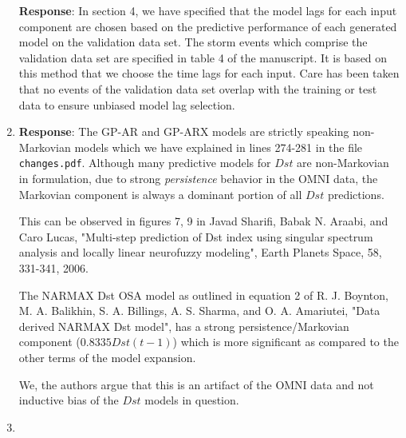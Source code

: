 \documentclass{article}
\begin{document}
\begin{enumerate}
{\textbf{Response}: In section 4, we have specified that the model lags for each input component are chosen based on the predictive performance of each generated model on the validation data set. The storm events which comprise the validation data set are specified in table 4 of the manuscript. It is based on this method that we choose the time lags for each input. Care has been taken that no events of the validation data set overlap with the training or test data to ensure unbiased model lag selection.


}

\item{


\textbf{Response}: The GP-AR and GP-ARX models are strictly speaking non-Markovian models which we have explained in lines 274-281 in the file \texttt{changes.pdf}. Although many predictive models for $Dst$ are non-Markovian in formulation, due to strong \emph{persistence} behavior in the OMNI data, the Markovian component is always a dominant portion of all $Dst$ predictions. 

This can be observed in figures 7, 9 in Javad Sharifi, Babak N. Araabi, and Caro Lucas, "Multi-step prediction of Dst index using singular spectrum analysis and locally linear neurofuzzy modeling", Earth Planets Space, 58, 331-341, 2006. 

The NARMAX Dst OSA model as outlined in equation 2 of R. J. Boynton, M. A. Balikhin, S. A. Billings, A. S. Sharma, and O. A. Amariutei, "Data derived NARMAX Dst model", has a strong persistence/Markovian component ($0.8335 Dst(t-1)$) which is more significant as compared to the other terms of the model expansion.

We, the authors argue that this is an artifact of the OMNI data and not inductive bias of the $Dst$ models in question.


}

\item{

}
\end{enumerate}
\end{document}
